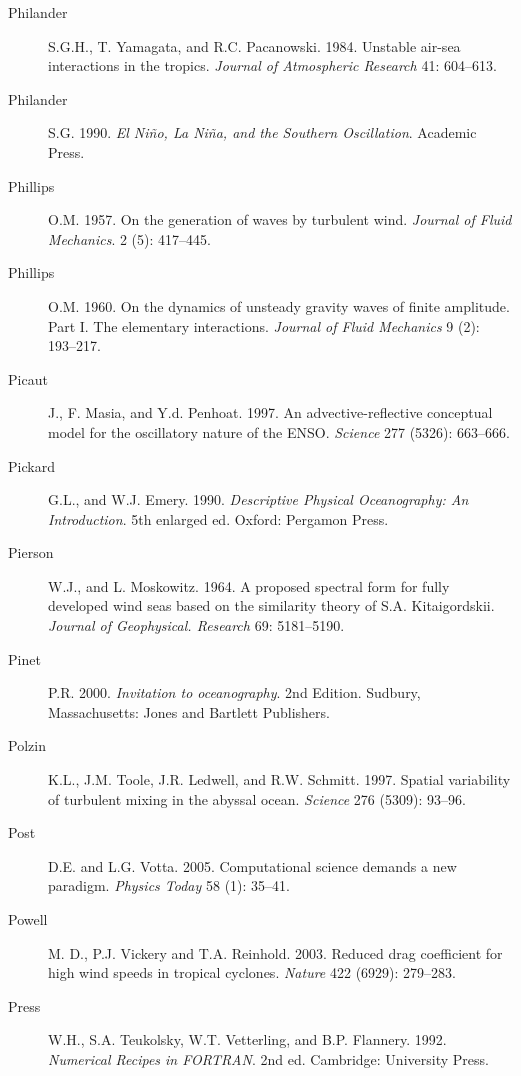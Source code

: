 \begin{description}
\item [Philander]S.G.H., T. Yamagata, and R.C. Pacanowski. 1984. Unstable
air-sea interactions in the tropics. \textit{Journal of Atmospheric Research} 41:
604--613.

\item [Philander]S.G. 1990. \textit{El Ni\~{n}o, La Ni\~{n}a, and the Southern
Oscillation}. Academic Press.

\item [Phillips]O.M. 1957. On the generation of waves by turbulent wind.
\textit{Journal of Fluid Mechanics}. 2 (5): 417--445.

\item [Phillips]O.M. 1960. On the dynamics of unsteady gravity waves of finite
amplitude.  Part I.  The elementary interactions. \textit{Journal of Fluid
Mechanics} 9 (2): 193--217.

\item [Picaut]J., F. Masia, and Y.d. Penhoat. 1997. An advective-reflective
conceptual model for the oscillatory nature of the ENSO. \textit{Science} 277
(5326): 663--666.

\item [Pickard]G.L., and W.J. Emery. 1990. \textit{Descriptive Physical
Oceanography: An Introduction}. 5th enlarged ed. Oxford: Pergamon Press.

\item [Pierson]W.J., and L. Moskowitz. 1964. A proposed spectral form for fully
developed wind seas based on the similarity theory of S.A. Kitaigordskii.
\textit{Journal of Geophysical. Research} 69: 5181--5190.

\item [Pinet]P.R. 2000. \textit{Invitation to oceanography}. 2nd Edition.
Sudbury, Massachusetts: Jones and Bartlett Publishers.

\item [Polzin]K.L., J.M. Toole, J.R. Ledwell, and R.W. Schmitt. 1997. Spatial
variability of turbulent mixing in the abyssal ocean. \textit{Science} 276
(5309): 93--96.

\item[Post]D.E. and L.G. Votta. 2005. Computational science demands a new paradigm. \textit{Physics Today} 58 (1): 35--41.
	
\item [Powell]M. D., P.J. Vickery and T.A. Reinhold. 2003. Reduced drag
coefficient for high wind speeds in tropical cyclones. \textit{Nature} 422 (6929):
279--283.

\item [Press]W.H., S.A. Teukolsky, W.T. Vetterling, and B.P. Flannery. 1992.
\textit{Numerical Recipes in FORTRAN}. 2nd ed.  Cambridge: University Press.


\end{description}

